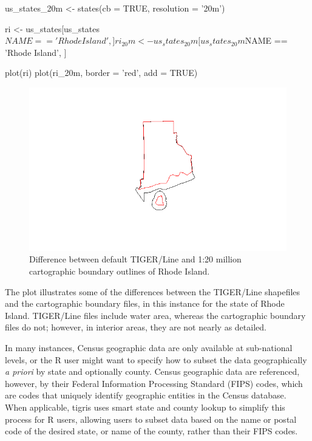 \begin{Schunk}
\begin{Sinput}
us_states_20m <- states(cb = TRUE, resolution = '20m')

ri <- us_states[us_states$NAME == 'Rhode Island', ]
ri_20m <- us_states_20m[us_states_20m$NAME == 'Rhode Island', ]

plot(ri)
plot(ri_20m, border = 'red', add = TRUE)
\end{Sinput}
\end{Schunk}

\begin{figure}[htbp]
  \centering
  \includegraphics[width=\textwidth]{rhode-island}
  \caption{Difference between default TIGER/Line and 1:20 million cartographic boundary outlines of Rhode Island.}
  \label{figure:rhode_island}
\end{figure}

The plot illustrates some of the differences between the TIGER/Line
shapefiles and the cartographic boundary files, in this instance for the
state of Rhode Island. TIGER/Line files include water area, whereas the
cartographic boundary files do not; however, in interior areas, they are
not nearly as detailed.

In many instances, Census geographic data are only available at
sub-national levels, or the R user might want to specify how to subset
the data geographically \emph{a priori} by state and optionally county.
Census geographic data are referenced, however, by their Federal
Information Processing Standard (FIPS) codes, which are codes that
uniquely identify geographic entities in the Census database. When
applicable, tigris uses smart state and county lookup to simplify this
process for R users, allowing users to subset data based on the name or
postal code of the desired state, or name of the county, rather than
their FIPS codes.

